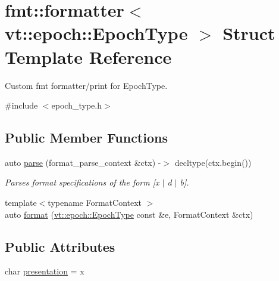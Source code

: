 \hypertarget{structfmt_1_1formatter_3_01vt_1_1epoch_1_1_epoch_type_01_4}{}\section{fmt\+:\+:formatter$<$ vt\+:\+:epoch\+:\+:Epoch\+Type $>$ Struct Template Reference}
\label{structfmt_1_1formatter_3_01vt_1_1epoch_1_1_epoch_type_01_4}


Custom fmt formatter/print for {\ttfamily Epoch\+Type}.  




{\ttfamily \#include $<$epoch\+\_\+type.\+h$>$}

\subsection*{Public Member Functions}
\begin{DoxyCompactItemize}
\item 
auto \hyperlink{structfmt_1_1formatter_3_01vt_1_1epoch_1_1_epoch_type_01_4_a6c360fe20d6ae9e16356a254228e66e7}{parse} (format\+\_\+parse\+\_\+context \&ctx) -\/$>$ decltype(ctx.\+begin())
\begin{DoxyCompactList}\small\item\em Parses format specifications of the form \mbox{[}\textquotesingle{}x\textquotesingle{} $\vert$ \textquotesingle{}d\textquotesingle{} $\vert$ \textquotesingle{}b\textquotesingle{}\mbox{]}. \end{DoxyCompactList}\item 
{\footnotesize template$<$typename Format\+Context $>$ }\\auto \hyperlink{structfmt_1_1formatter_3_01vt_1_1epoch_1_1_epoch_type_01_4_ac72f5cb95971217a5b037a15d06941cd}{format} (\hyperlink{structvt_1_1epoch_1_1_epoch_type}{vt\+::epoch\+::\+Epoch\+Type} const \&e, Format\+Context \&ctx)
\end{DoxyCompactItemize}
\subsection*{Public Attributes}
\begin{DoxyCompactItemize}
\item 
char \hyperlink{structfmt_1_1formatter_3_01vt_1_1epoch_1_1_epoch_type_01_4_ac1feeb2c08d651fe22aa6fc600a207cf}{presentation} = \textquotesingle{}x\textquotesingle{}
\end{DoxyCompactItemize}


